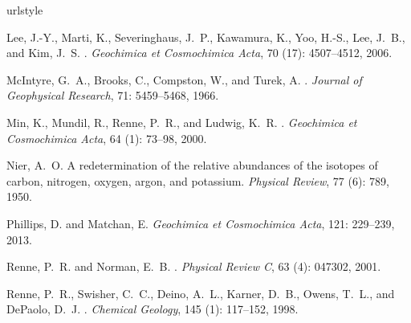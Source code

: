 \documentclass{article}
\begin{document}
\clearpage

%
%

\begin{thebibliography}{12}
\providecommand{\natexlab}[1]{#1}
\providecommand{\url}[1]{\texttt{#1}}
\expandafter\ifx\csname urlstyle\endcsname\relax
  \providecommand{\doi}[1]{doi: #1}\else
  \providecommand{\doi}{doi: \begingroup \urlstyle{rm}\Url}\fi

Lee, J.-Y., Marti, K., Severinghaus, J.~P., Kawamura, K., Yoo, H.-S., Lee,
  J.~B., and Kim, J.~S.
.
\newblock \emph{Geochimica et Cosmochimica Acta}, 70 (17):
  4507--4512, 2006.

{McIntyre}, G.~A., {Brooks}, C., {Compston}, W., and {Turek}, A.
.
\newblock \emph{Journal of Geophysical Research}, 71: 5459--5468,
  1966.

Min, K., Mundil, R., Renne, P.~R., and Ludwig, K.~R.
.
\newblock \emph{Geochimica et Cosmochimica Acta}, 64 (1):
  73--98, 2000.

Nier, A.~O.
\newblock A redetermination of the relative abundances of the isotopes of
  carbon, nitrogen, oxygen, argon, and potassium.
\newblock \emph{Physical Review}, 77 (6): 789, 1950.

Phillips, D. and Matchan, E.
\newblock \emph{Geochimica et Cosmochimica Acta}, 121: 229--239, 2013.

Renne, P.~R. and Norman, E.~B.
.
\newblock \emph{Physical Review C}, 63 (4): 047302, 2001.

Renne, P.~R., Swisher, C.~C., Deino, A.~L., Karner, D.~B., Owens, T.~L., and
  DePaolo, D.~J.
.
\newblock \emph{Chemical Geology}, 145 (1): 117--152, 1998.


\end{thebibliography}
\end{document}
